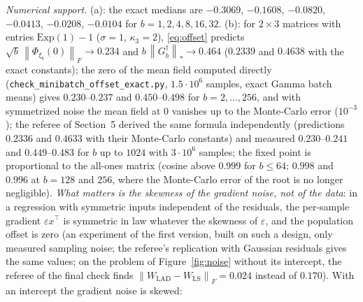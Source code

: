 \documentclass[11pt]{article}
\theoremstyle{definition}
\theoremstyle{remark}
\newcommand{\nnuc}[1]{\left\|#1\right\|_{*}}
\newcommand{\nF}[1]{\left\|#1\right\|_{F}}
\begin{document}
\noindent\emph{Numerical support.} (a): the exact medians are $-0.3069$, $-0.1608$, $-0.0820$, $-0.0413$, $-0.0208$,
$-0.0104$ for $b=1,2,4,8,16,32$. (b): for $2\times3$ matrices with entries $\mathrm{Exp}(1)-1$ ($\sigma=1$, $\kappa_3=2$), \eqref{eq:offset}
predicts $\sqrt b\,\nF{\Phi_{\xi_b}(0)}\to0.234$ and $b\,\nnuc{G_b^\dagger}\to0.464$ ($0.2339$ and $0.4638$ with the exact
constants); the zero of the mean field computed
directly (\texttt{check\_minibatch\_offset\_exact.py}, $1.5\cdot10^6$ samples, exact Gamma batch means) gives
$0.230$--$0.237$ and $0.450$--$0.498$ for $b=2,\dots,256$, and with symmetrized noise the mean field at $0$ vanishes
up to the Monte-Carlo error ($10^{-3}$); the referee of Section~5 derived the same formula independently (predictions
$0.2336$ and $0.4633$ with their Monte-Carlo constants) and
measured $0.230$--$0.241$ and $0.449$--$0.483$ for $b$ up to $1024$ with $3\cdot10^6$ samples; the fixed point is
proportional to the all-ones matrix (cosine above $0.999$ for $b\le64$; $0.998$ and $0.996$ at $b=128$ and $256$, where
the Monte-Carlo error of the root is no longer negligible). \emph{What matters is the skewness of the gradient
noise, not of the data}: in a regression with symmetric inputs independent of the residuals, the per-sample gradient
$\varepsilon x^\top$ is symmetric in law whatever the skewness of $\varepsilon$, and the population offset is zero (an
experiment of the first version, built on such a design, only measured sampling noise; the referee's replication with
Gaussian residuals gives the same values; on the problem of Figure~\ref{fig:noise} without its intercept, the referee
of the final check finds $\nF{W_{\mathrm{LAD}}-W_{\mathrm{LS}}}=0.024$ instead of $0.170$). With an intercept the
gradient noise is skewed:
\end{document}
